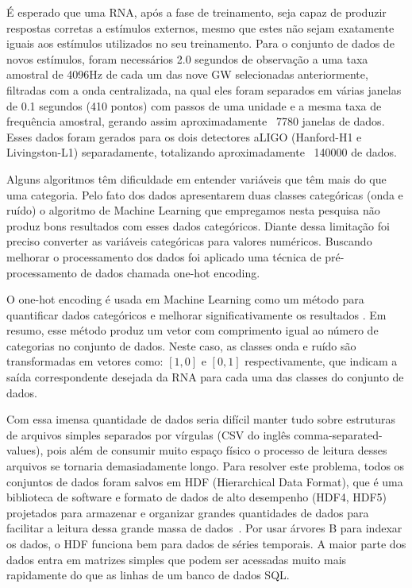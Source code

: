 É esperado que uma RNA, após a fase de treinamento, seja capaz de produzir respostas corretas a estímulos externos, mesmo que estes não sejam exatamente iguais aos estímulos utilizados no seu treinamento. Para o conjunto de dados de novos estímulos, foram necessários 2.0 segundos de observação a uma taxa amostral de 4096Hz de cada um das nove GW selecionadas anteriormente, filtradas com a onda centralizada, na qual eles foram separados em várias janelas de 0.1 segundos (410 pontos) com passos de uma unidade e a mesma taxa de frequência amostral, gerando assim aproximadamente ~7780 janelas de dados. Esses dados foram gerados para os dois detectores aLIGO (Hanford-H1 e Livingston-L1) separadamente, totalizando aproximadamente ~140000 de dados.

Alguns algoritmos têm dificuldade em entender variáveis que têm mais do que uma categoria. Pelo fato dos dados apresentarem duas classes categóricas (onda e ruído) o algoritmo de Machine Learning que empregamos nesta pesquisa não produz bons resultados com esses dados categóricos. Diante dessa limitação foi preciso converter as variáveis categóricas para valores numéricos. Buscando melhorar o processamento dos dados foi aplicado uma técnica de pré-processamento de dados chamada one-hot encoding. 

O one-hot encoding é usada em Machine Learning como um método para quantificar dados categóricos e melhorar significativamente os resultados \cite{gunjanmodern, sarkar2017practical}. Em resumo, esse método produz um vetor com comprimento igual ao número de categorias no conjunto de dados. Neste caso, as classes onda e ruído são transformadas em vetores como: $[1,0]$ e $[0,1]$ respectivamente, que indicam a saída correspondente desejada da RNA para cada uma das classes do conjunto de dados.

Com essa imensa quantidade de dados seria difícil manter tudo sobre estruturas de arquivos simples separados por vírgulas (CSV do inglês comma-separated-values), pois além de consumir muito espaço físico o processo de leitura desses arquivos se tornaria demasiadamente longo. Para resolver este problema, todos os conjuntos de dados foram salvos em HDF (Hierarchical Data Format), que é uma biblioteca de software e formato de dados de alto desempenho (HDF4, HDF5) projetados para armazenar e organizar grandes quantidades de dados para facilitar a leitura dessa grande massa de dados~\cite{hdf}. Por usar árvores B para indexar os dados, o HDF funciona bem para dados de séries temporais. A maior parte dos dados entra em matrizes simples que podem ser acessadas muito mais rapidamente do que as linhas de um banco de dados SQL. 

